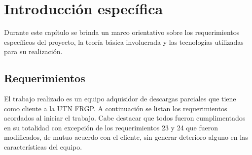 \chapter{Introducción específica} %

\label{Chapter2}

Durante este capítulo se brinda un marco orientativo sobre los requerimientos específicos del proyecto, la teoría básica involucrada y las tecnologías utilizadas para su realización.

\section{Requerimientos}
El trabajo realizado es un equipo adquisidor de descargas parciales que tiene como cliente a la UTN FRGP. 
A continuación se listan los requerimientos acordados al iniciar el trabajo. Cabe destacar que todos fueron cumplimentados en su totalidad con excepción de los requerimientos 23 y 24 que fueron modificados, de mutuo acuerdo con el cliente, sin generar deterioro alguno en las características del equipo.

